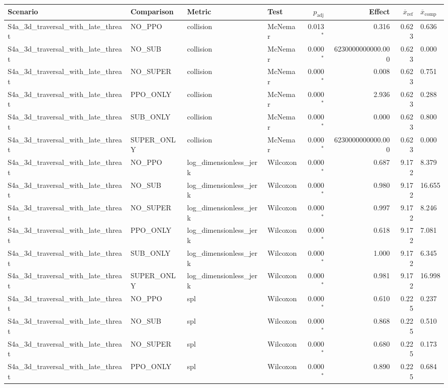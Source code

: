 \begin{tabular}{llllrrrl}
\toprule
Scenario & Comparison & Metric & Test & $p_\mathrm{adj}$ & Effect & $\overline{x}_\mathrm{ref}$ & $\overline{x}_\mathrm{comp}$ \\
\midrule
  S4a_3d_traversal_with_late_threat & NO_PPO & collision & McNemar & 0.013$^{*}$ & 0.316 & 0.623 & 0.636 \\
  S4a_3d_traversal_with_late_threat & NO_SUB & collision & McNemar & 0.000$^{*}$ & 6230000000000.000 & 0.623 & 0.000 \\
  S4a_3d_traversal_with_late_threat & NO_SUPER & collision & McNemar & 0.000$^{*}$ & 0.008 & 0.623 & 0.751 \\
  S4a_3d_traversal_with_late_threat & PPO_ONLY & collision & McNemar & 0.000$^{*}$ & 2.936 & 0.623 & 0.288 \\
  S4a_3d_traversal_with_late_threat & SUB_ONLY & collision & McNemar & 0.000$^{*}$ & 0.000 & 0.623 & 0.800 \\
  S4a_3d_traversal_with_late_threat & SUPER_ONLY & collision & McNemar & 0.000$^{*}$ & 6230000000000.000 & 0.623 & 0.000 \\
  S4a_3d_traversal_with_late_threat & NO_PPO & log_dimensionless_jerk & Wilcoxon & 0.000$^{*}$ & 0.687 & 9.172 & 8.379 \\
  S4a_3d_traversal_with_late_threat & NO_SUB & log_dimensionless_jerk & Wilcoxon & 0.000$^{*}$ & 0.980 & 9.172 & 16.655 \\
  S4a_3d_traversal_with_late_threat & NO_SUPER & log_dimensionless_jerk & Wilcoxon & 0.000$^{*}$ & 0.997 & 9.172 & 8.246 \\
  S4a_3d_traversal_with_late_threat & PPO_ONLY & log_dimensionless_jerk & Wilcoxon & 0.000$^{*}$ & 0.618 & 9.172 & 7.081 \\
  S4a_3d_traversal_with_late_threat & SUB_ONLY & log_dimensionless_jerk & Wilcoxon & 0.000$^{*}$ & 1.000 & 9.172 & 6.345 \\
  S4a_3d_traversal_with_late_threat & SUPER_ONLY & log_dimensionless_jerk & Wilcoxon & 0.000$^{*}$ & 0.981 & 9.172 & 16.998 \\
  S4a_3d_traversal_with_late_threat & NO_PPO & spl & Wilcoxon & 0.000$^{*}$ & 0.610 & 0.225 & 0.237 \\
  S4a_3d_traversal_with_late_threat & NO_SUB & spl & Wilcoxon & 0.000$^{*}$ & 0.868 & 0.225 & 0.510 \\
  S4a_3d_traversal_with_late_threat & NO_SUPER & spl & Wilcoxon & 0.000$^{*}$ & 0.680 & 0.225 & 0.173 \\
  S4a_3d_traversal_with_late_threat & PPO_ONLY & spl & Wilcoxon & 0.000$^{*}$ & 0.890 & 0.225 & 0.684 \\

\end{tabular}
